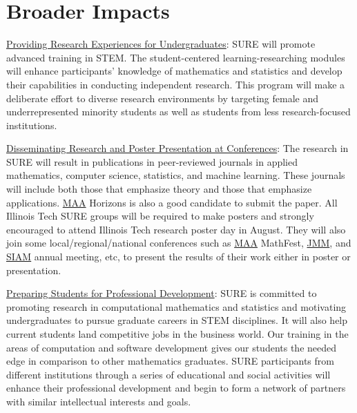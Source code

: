 \documentclass[11pt]{NSFamsart}
\newcommand{\Upara}[1]{\noindent\underline{\upshape #1}:}
\newcommand{\MAA}{\hyperlink{MAAlink}{MAA}\xspace}
\newcommand{\JMM}{\hyperlink{JMMlink}{JMM}\xspace}
\newcommand{\SIAM}{\hyperlink{SIAMlink}{SIAM}\xspace}
\begin{document}
    


\section{Broader Impacts}
\begin{sloppypar}\Upara{Providing Research Experiences for Undergraduates} 
SURE will promote advanced training in STEM. The student-centered learning-researching modules will enhance participants’ knowledge of
mathematics and statistics and develop their capabilities in conducting independent research. This program will make a deliberate effort to diverse research environments by targeting female and underrepresented minority students as well as students from less research-focused institutions. \end{sloppypar}

\Upara{Disseminating Research and Poster Presentation at Conferences}
The research in SURE will result in publications in peer-reviewed journals in applied mathematics, computer science, statistics, and machine learning. These journals will include both those that emphasize theory and those that emphasize applications. \MAA Horizons is also a good candidate to submit the paper. All Illinois Tech SURE groups will be required to make posters and strongly encouraged to attend Illinois Tech research poster day in August. They will also join some local/regional/national conferences such as \MAA MathFest, \JMM, and \SIAM annual meeting, etc, to present the results of their work either in poster or presentation.


\Upara{Preparing Students for Professional  Development} 
SURE is committed to promoting research in computational mathematics and statistics and motivating undergraduates to pursue graduate careers in STEM disciplines. It will also help current students land competitive jobs in the business world. Our training in the areas of computation and software development gives our students the needed edge in comparison to other mathematics graduates. SURE participants from different institutions through a series of educational and social activities will enhance their professional development and begin to form a network of partners with similar intellectual interests and goals. 
\end{document}
